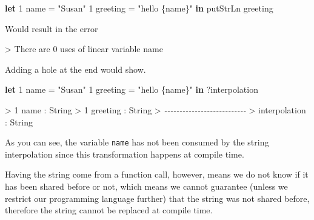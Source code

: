 \documentclass[
]{article}
\newenvironment{Shaded}{}{}
\newcommand{\CommentTok}[1]{\textcolor[rgb]{0.38,0.63,0.69}{\textit{#1}}}
\newcommand{\DataTypeTok}[1]{\textcolor[rgb]{0.56,0.13,0.00}{#1}}
\newcommand{\DecValTok}[1]{\textcolor[rgb]{0.25,0.63,0.44}{#1}}
\newcommand{\FunctionTok}[1]{\textcolor[rgb]{0.02,0.16,0.49}{#1}}
\newcommand{\KeywordTok}[1]{\textcolor[rgb]{0.00,0.44,0.13}{\textbf{#1}}}
\newcommand{\NormalTok}[1]{#1}
\newcommand{\OperatorTok}[1]{\textcolor[rgb]{0.40,0.40,0.40}{#1}}
\newcommand{\OtherTok}[1]{\textcolor[rgb]{0.00,0.44,0.13}{#1}}
\newcommand{\StringTok}[1]{\textcolor[rgb]{0.25,0.44,0.63}{#1}}
\begin{document}
\begin{Shaded}
\begin{Highlighting}[]
\KeywordTok{let} \DecValTok{1}\NormalTok{ name }\OtherTok{=} \StringTok{"Susan"}
    \DecValTok{1}\NormalTok{ greeting }\OtherTok{=} \StringTok{"hello \{name\}"} \KeywordTok{in}
    \FunctionTok{putStrLn}\NormalTok{ greeting}
\end{Highlighting}
\end{Shaded}

Would result in the error

\begin{Shaded}
\begin{Highlighting}[]
\OperatorTok{\textgreater{}}\NormalTok{ There are }\DecValTok{0}\NormalTok{ uses of linear variable name}
\end{Highlighting}
\end{Shaded}

Adding a hole at the end would show.

\begin{Shaded}
\begin{Highlighting}[]
\KeywordTok{let} \DecValTok{1}\NormalTok{ name }\OtherTok{=} \StringTok{"Susan"}
    \DecValTok{1}\NormalTok{ greeting }\OtherTok{=} \StringTok{"hello \{name\}"} \KeywordTok{in}
    \OperatorTok{?}\NormalTok{interpolation}
\end{Highlighting}
\end{Shaded}

\begin{Shaded}
\begin{Highlighting}[]
\OperatorTok{\textgreater{}} \DecValTok{1}\NormalTok{ name }\OperatorTok{:} \DataTypeTok{String}
\OperatorTok{\textgreater{}} \DecValTok{1}\NormalTok{ greeting }\OperatorTok{:} \DataTypeTok{String}
\OperatorTok{\textgreater{}} \CommentTok{{-}{-}{-}{-}{-}{-}{-}{-}{-}{-}{-}{-}{-}{-}{-}{-}{-}{-}{-}{-}{-}{-}{-}{-}{-}{-}{-}}
\OperatorTok{\textgreater{}}\NormalTok{ interpolation }\OperatorTok{:} \DataTypeTok{String}
\end{Highlighting}
\end{Shaded}

As you can see, the variable \texttt{name} has not been consumed by the
string interpolation since this transformation happens at compile time.

Having the string come from a function call, however, means we do not
know if it has been shared before or not, which means we cannot
guarantee (unless we restrict our programming language further) that the
string was not shared before, therefore the string cannot be replaced at
compile time.
\end{document}
